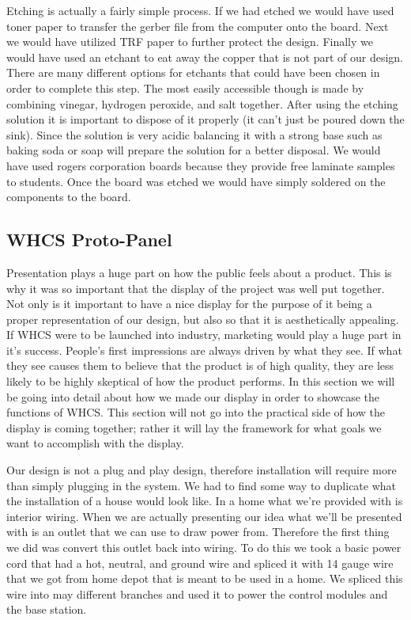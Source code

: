 Etching is actually a fairly simple process. If we had etched we would have used toner paper to transfer the gerber file from the computer onto the board. Next
we would have utilized TRF paper to further protect the design. Finally we would have used an etchant to eat away the copper that is not part of our design. There
are many different options for etchants that could have been chosen in order to
complete this step. The most easily accessible though is made by combining
vinegar, hydrogen peroxide, and salt together. After using the etching solution
it is important to dispose of it properly (it can{}'t just be poured down the
sink). Since the solution is very acidic balancing it with a strong base such
as baking soda or soap will prepare the solution for a better disposal. We would have used rogers corporation boards because they provide free
laminate samples to students. Once the board was etched we would have simply soldered on
the components to the board. 

\subsection{WHCS Proto-Panel}
\label{sec:proto-panel-proto}
Presentation plays a huge part on how the public feels about a product. This is
why it was so important that the display of the project was well put together.
Not only is it important to have a nice display for the purpose of it being a
proper representation of our design, but also so that it is aesthetically
appealing. If WHCS were to be launched into industry, marketing would play a
huge part in it{}'s success. People{}'s first impressions are always driven by
what they see. If what they see causes them to believe that the product is of
high quality, they are less likely to be highly skeptical of how the product
performs. In this section we will be going into detail about how we made our display
in order to showcase the functions of WHCS. This section will not go into the
practical side of how the display is coming together; rather it will lay the framework for what goals we want to
accomplish with the display.

Our design is not a plug and play design, therefore installation will require more than simply plugging in the system. We had to find some way to
duplicate what the installation of a house would look like. In a home what
we{}'re provided with is interior wiring. When we are actually presenting our
idea what we{}'ll be presented with is an outlet that we can use to draw power
from. Therefore the first thing we did was convert this outlet
back into wiring. To do this we took a basic power cord that had a hot, neutral, and ground wire and spliced it with 14 gauge wire that we got from home depot that is meant to be used in a home. We spliced this wire into may different branches and used it to power the control modules and the base station. 

